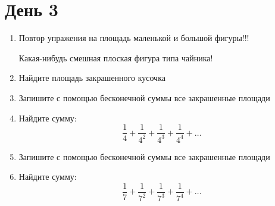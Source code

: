 \documentclass[a4paper, 12pt]{article}
\begin{document}
\section{День 3}

\begin{enumerate}

  \item Повтор упражения на площадь маленькой и большой фигуры!!!

    Какая-нибудь смешная плоская фигура типа чайника!

  \item Найдите площадь закрашенного кусочка 




    \vspace{5cm}


\newpage
\item Запишите с помощью бесконечной суммы все  закрашенные площади 

 \vspace{5cm}


\item Найдите сумму:
\[
  \frac{1}{4} + \frac{1}{4^2} + \frac{1}{4^3} + \frac{1}{4^4} + \ldots
\]


\item Запишите с помощью бесконечной суммы все  закрашенные площади 

  \vspace{5cm}
  


\item Найдите сумму:
\[
  \frac{1}{7} + \frac{1}{7^2} + \frac{1}{7^3} + \frac{1}{7^4} + \ldots
\]
\end{enumerate}
\end{document}
